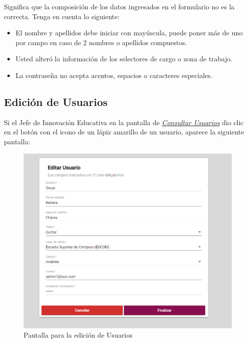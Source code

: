 \begin{itemize}
\begin{figure}[H]
                        \end{figure}

                        Significa que la composición de los datos ingresados en el formulario no es la correcta. Tenga en cuenta lo siguiente:

                        \begin{itemize}
                            \item El nombre y apellidos debe iniciar con mayúscula, puede poner más de uno por campo en caso de 2 nombres o apellidos compuestos.
                            \item Usted alteró la información de los selectores de cargo o zona de trabajo.
                            \item La contraseña no acepta acentos, espacios o caracteres especiales.
                        \end{itemize}

                \end{itemize}

\newpage

            \hypertarget{editar-user}{}
            \subsection{Edición de Usuarios}
                Si el Jefe de Innovación Educativa en la pantalla de \hyperlink{consultarUs}{\textit{Consultar Usuarios}} dio clic en el botón con el icono de un lápiz amarillo de un usuario, aparece la siguiente pantalla:

                \begin{figure}[H]
                    \centering
                    \hypertarget{editarUs}{\includegraphics[width=0.6\linewidth]{images/SP5/Editar-Usuario}}
                    \caption{Pantalla para la edición de Usuarios}
                    \label{editarrh}
                \end{figure}

